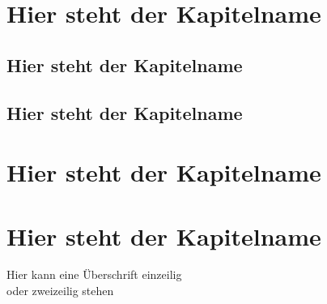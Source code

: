 \documentclass[aspectratio=169]{beamer}
\begin{document}
\section{Hier steht der Kapitelname}
\subsection{Hier steht der Kapitelname}
\subsection{Hier steht der Kapitelname}

\section{Hier steht der Kapitelname}
\section{Hier steht der Kapitelname}

\begin{frame}{Hier kann eine Überschrift einzeilig\\oder zweizeilig stehen}
	\blindtext
\end{frame}
\end{document}
